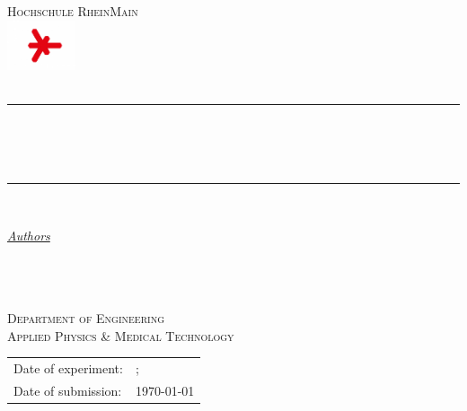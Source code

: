 \begin{titlepage} 
	\newcommand{\HRule}{\rule{\linewidth}{0.5mm}} 	
	\centering
	\textsc{\Large Hochschule RheinMain \\
		\includegraphics[width=0.15\textwidth]{logo-hsrm}\\[1cm]}
	\textsc{\LARGE \titelLV}\\[0.5cm]
		\HRule\\[0.4cm]
	{\huge\bfseries \untertitela}\\[0.4cm] %
	{\huge\bfseries \untertitelb}\\[0.4cm] %
		\HRule\\[1.5cm]
	\begin{minipage}{0.4\textwidth}
		\large
		\textit{\underline{Authors}}\\[0.5cm]
		\textsc{\nameA}\\[0.5cm]
		\textsc{\nameB}\\[0.5cm]
		\textsc{\nameC}\\[0.5cm]
\end{minipage}
\vfill\vfill\vfill 
\textsc{\Large Department of Engineering}\\[0.5cm]
\textsc{\large Applied Physics \& Medical Technology}\\[0.5cm]
\vfill
\begin{tabular}{ll}
	Date of experiment:\hspace{0.4cm} &{\large\dateLVa; \dateLVb}\\
	Date of submission:\hspace{0.4cm} &{\large\today} 
\end{tabular}
\end{titlepage}
